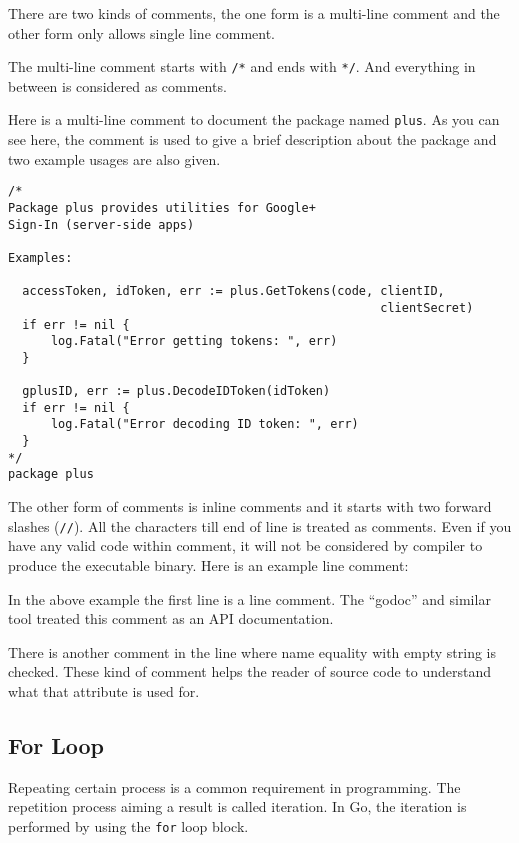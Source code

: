 There are two kinds of comments, the one form is a multi-line comment
and the other form only allows single line comment.

The multi-line comment starts with \texttt{/*} and ends
with \texttt{*/}.  And everything in between is considered as
comments.

Here is a multi-line comment to document the package
named \texttt{plus}.  As you can see here, the comment is used to give
a brief description about the package and two example usages are also
given.

\begin{lstlisting}[caption=Package level comment]
/*
Package plus provides utilities for Google+
Sign-In (server-side apps)

Examples:

  accessToken, idToken, err := plus.GetTokens(code, clientID,
                                                    clientSecret)
  if err != nil {
      log.Fatal("Error getting tokens: ", err)
  }

  gplusID, err := plus.DecodeIDToken(idToken)
  if err != nil {
      log.Fatal("Error decoding ID token: ", err)
  }
*/
package plus
\end{lstlisting}

The other form of comments is inline comments and it starts with two
forward slashes (\texttt{//}).  All the characters till end of line is
treated as comments.  Even if you have any valid code within comment,
it will not be considered by compiler to produce the executable
binary.  Here is an example line comment:



In the above example the first line is a line comment.  The ``godoc''
and similar tool treated this comment as an API documentation.

There is another comment in the line where name equality with empty
string is checked.  These kind of comment helps the reader of
source code to understand what that attribute is used for.

\subsection{For Loop}

Repeating certain process is a common requirement in programming.  The
repetition process aiming a result is called iteration.  In Go, the
iteration is performed by using the \texttt{for} loop
block.

